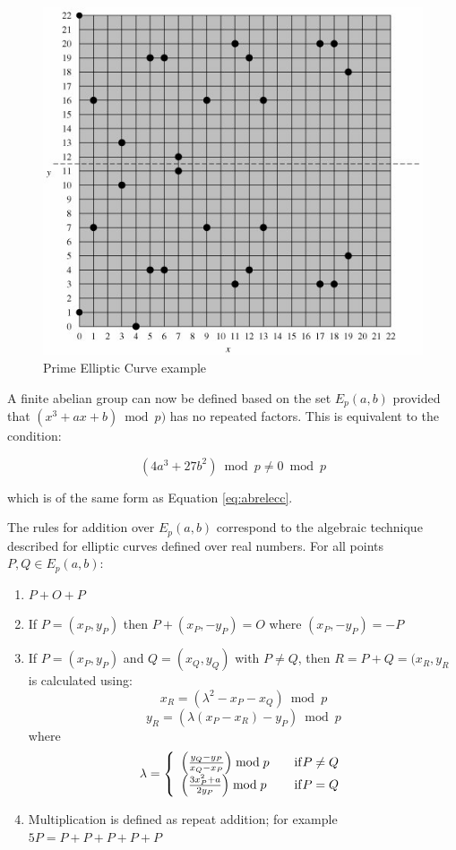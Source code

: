 \documentclass[a4paper,10pt]{report}
\begin{document}
\begin{figure}[htb]
\centering
\includegraphics[scale=0.7]{images/ecczpexample.jpg}
\caption{Prime Elliptic Curve example}
\label{fig:ecczpexample}
\end{figure}

A finite abelian group can now be defined based on the set $E_{p}(a,b)$ provided that $(x^3 + ax + b) \bmod p)$ has no repeated factors. This is equivalent to the condition:

\begin{equation}
 (4a^3 + 27b^2) \bmod p \neq 0 \bmod p
 \label{eq:ecczpcon}
\end{equation}

which is of the same form as Equation \ref{eq:abrelecc}.

The rules for addition over $E_{p}(a,b)$ correspond to the algebraic technique described for elliptic curves defined over real numbers. For all points $P, Q \in E_{p}(a,b)$:

\begin{enumerate}
 \item $P + O + P$
 \item If $P = (x_{P},y_{P})$ then $P + (x_{P},-y_{P}) = O$ where $(x_{P},-y_{P}) = -P$
 \item If $P = (x_{P},y_{P})$ and $Q = (x_{Q},y_{Q})$ with $P \neq Q$, then $R = P + Q = (x_{R},y_{R}$ is calculated using:
	\[x_{R} = (\lambda^2 - x_{P} - x_{Q}) \bmod p \]
        \[ y_{R} = (\lambda(x_{P} - x_{R}) - y_{P}) \bmod p\]
 where
 \[ \lambda = \left\{
  \begin{array}{l l}
    \left( \frac{y_{Q} - y_{P}}{x_{Q} - x_{P}} \right) \bmod p & \quad \mathrm{if} P \neq Q \\
    \left(\frac{3x^{2}_{P} + a}{2y_{P}}\right) \bmod p & \quad \mathrm{if} P = Q
  \end{array} \right.
\]

 \item Multiplication is defined as repeat addition; for example $5P = P + P + P + P + P$
\end{enumerate}
\end{document}
